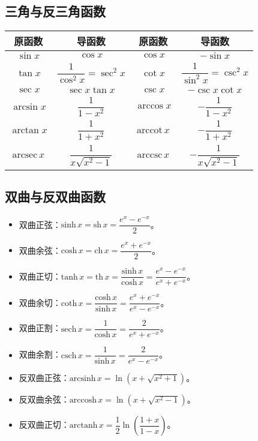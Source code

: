 \documentclass[UTF8, 12pt]{ctexart}
\begin{document}
\subsection{三角与反三角函数}

\begin{center}
    \begin{tabular}{|c|c|c|c|}
        \hline
        原函数 & 导函数 & 原函数 & 导函数\\ \hline
        $\sin x$ & $\cos x$ & $\cos x$ & $-\sin x$ \\ \hline
        $\tan x$ & $\dfrac{1}{\cos^2x}=\sec^2x$ & $\cot x$ & $\dfrac{1}{\sin^2x}=\csc^2x$ \\ \hline
        $\sec x$ & $\sec x\tan x$ & $\csc x$ & $-\csc x\cot x$ \\ \hline
        $\arcsin x$ & $\dfrac{1}{1-x^2}$ & $\arccos x$ & $-\dfrac{1}{1-x^2}$ \\ \hline
        $\arctan x$ & $\dfrac{1}{1+x^2}$ & $\textrm{arccot}\,x$ & $-\dfrac{1}{1+x^2}$ \\ \hline
        $\textrm{arcsec}\,x$ & $\dfrac{1}{x\sqrt{x^2-1}}$ & $\textrm{arccsc}\,x$ & $-\dfrac{1}{x\sqrt{x^2-1}}$ \\
        \hline
    \end{tabular}
\end{center}

\subsection{双曲与反双曲函数}

\begin{itemize}
    \item 双曲正弦：$\textrm{sinh}\,x=\textrm{sh}\,x=\dfrac{e^{x}-e^{-x}}{2}$。
    \item 双曲余弦：$\textrm{cosh}\,x=\textrm{ch}\,x=\dfrac{e^{x}+e^{-x}}{2}$。
    \item 双曲正切：$\textrm{tanh}\,x=\textrm{th}\,x=\dfrac{\textrm{sinh}\,x}{\textrm{cosh}\,x}=\dfrac{e^{x}-e^{-x}}{e^{x}+e^{-x}}$。
    \item 双曲余切：$\textrm{coth}\,x=\dfrac{\textrm{cosh}\,x}{\textrm{sinh}\,x}=\dfrac{e^{x}+e^{-x}}{e^{x}-e^{-x}}$。
    \item 双曲正割：$\textrm{sech}\,x=\dfrac{1}{\textrm{cosh}\,x}=\dfrac{2}{e^{x}+e^{-x}}$。
    \item 双曲余割：$\textrm{csch}\,x=\dfrac{1}{\textrm{sinh}\,x}=\dfrac{2}{e^{x}-e^{-x}}$。
    \item 反双曲正弦：$\textrm{arcsinh}\,x=\ln\left(x+\sqrt{x^2+1}\right)$。
    \item 反双曲余弦：$\textrm{arccosh}\,x=\ln\left(x+\sqrt{x^2-1}\right)$。
    \item 反双曲正切：$\textrm{arctanh}\,x=\dfrac{1}{2}\ln\left(\dfrac{1+x}{1-x}\right)$。
\end{itemize}
\end{document}
